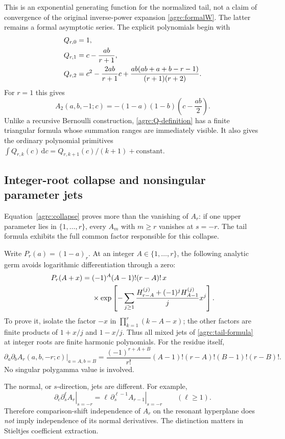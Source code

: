 \documentclass[11pt]{article}
\numberwithin{equation}{section}
\theoremstyle{definition}\newtheorem{definition}[theorem]{Definition}
\theoremstyle{remark}\newtheorem{remark}[theorem]{Remark}
\newcommand{\dd}{\,\mathrm d}
\begin{document}
This is an exponential generating function for the normalized tail,
not a claim of convergence of the original inverse-power expansion
\eqref{agrc:formalW}. The latter remains a formal asymptotic series.
The explicit polynomials begin with
\begin{align}
 Q_{r,0}&=1,\notag\\
 Q_{r,1}&=c-\frac{ab}{r+1},\notag\\
 Q_{r,2}&=c^2-\frac{2ab}{r+1}c
      +\frac{ab(ab+a+b-r-1)}{(r+1)(r+2)}.
 \label{agrc:Q-examples}
\end{align}
For $r=1$ this gives
\[
 A_2(a,b,-1;c)=-(1-a)(1-b)\left(c-\frac{ab}{2}\right).
\]
Unlike a recursive Bernoulli construction, \eqref{agrc:Q-definition}
has a finite triangular formula whose summation ranges are immediately
visible. It also gives the ordinary polynomial primitives
$\int Q_{r,k}(c)\dd c=Q_{r,k+1}(c)/(k+1)+\mathrm{constant}$.

\subsection{Integer-root collapse and nonsingular parameter jets}

Equation~\eqref{agrc:collapse} proves more than the vanishing of $A_r$:
if one upper parameter lies in $\{1,\ldots,r\}$, every $A_m$ with
$m\geq r$ vanishes at $s=-r$. The tail formula exhibits the full common
factor responsible for this collapse.

Write $P_r(a)=(1-a)_r$. At an integer $A\in\{1,\ldots,r\}$, the
following analytic germ avoids logarithmic differentiation through a
zero:
\begin{align}
 P_r(A+x)={}&(-1)^A(A-1)!(r-A)!\,x\notag\\
 &\times\exp\left[-\sum_{j\geq1}
  \frac{H_{r-A}^{(j)}+(-1)^jH_{A-1}^{(j)}}j x^j\right].
 \label{agrc:root-jets}
\end{align}
To prove it, isolate the factor $-x$ in $\prod_{k=1}^r(k-A-x)$;
the other factors are finite products of $1+x/j$ and $1-x/j$.
Thus all mixed jets of \eqref{agrc:tail-formula} at integer roots are
finite harmonic polynomials. For the residue itself,
\begin{equation}\label{agrc:double-root}
 \left.\partial_a\partial_b A_r(a,b,-r;c)\right|_{a=A,b=B}
 =\frac{(-1)^{r+A+B}}{r!}
 (A-1)!(r-A)!(B-1)!(r-B)!.
\end{equation}
No singular polygamma value is involved.

The normal, or $s$-direction, jets are different. For example,
\begin{equation}\label{agrc:normal-transport}
 \left.\partial_c\partial_s^\ell A_r\right|_{s=-r}
 =\left.\ell\,\partial_s^{\ell-1}A_{r-1}\right|_{s=-r}
 \qquad(\ell\geq1).
\end{equation}
Therefore comparison-shift independence of $A_r$ on the resonant
hyperplane does \emph{not} imply independence of its normal derivatives.
The distinction matters in Stieltjes coefficient extraction.
\end{document}
